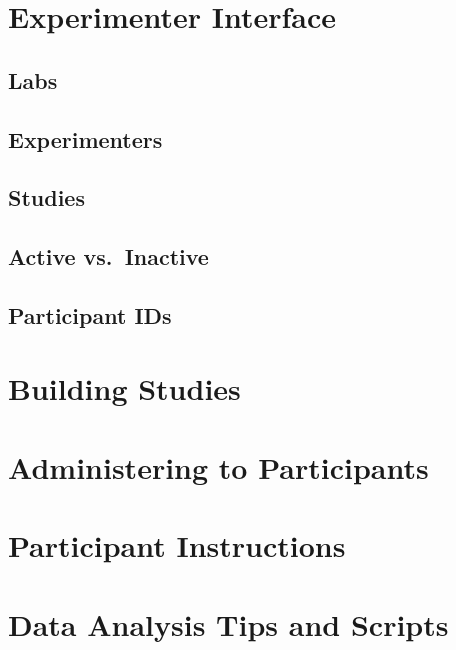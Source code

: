 \documentclass[
  12pt,
]{book}
\begin{document}
\hypertarget{experimenter-interface}{%
\chapter{Experimenter Interface}\label{experimenter-interface}}

\hypertarget{labs}{%
\section{Labs}\label{labs}}

\hypertarget{experimenters}{%
\section{Experimenters}\label{experimenters}}

\hypertarget{studies}{%
\section{Studies}\label{studies}}

\hypertarget{active-vs.-inactive}{%
\section{Active vs.~Inactive}\label{active-vs.-inactive}}

\hypertarget{participant-ids}{%
\section{Participant IDs}\label{participant-ids}}

\hypertarget{building-studies}{%
\chapter{Building Studies}\label{building-studies}}

\hypertarget{administering-to-participants}{%
\chapter{Administering to Participants}\label{administering-to-participants}}

\hypertarget{participant-instructions}{%
\chapter{Participant Instructions}\label{participant-instructions}}

\hypertarget{data-analysis-tips-and-scripts}{%
\chapter{Data Analysis Tips and Scripts}\label{data-analysis-tips-and-scripts}}
\end{document}
